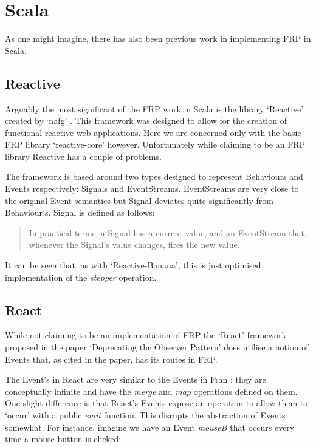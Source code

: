   \section{Scala}
    As one might imagine, there has also been previous work in implementing FRP in Scala. 

    \subsection{Reactive}
      Arguably the most significant of the FRP work in Scala is the library `Reactive' created by `nafg' \cite{Nafg}. This    
      framework was designed to allow for the creation of functional reactive web applications. Here we are concerned 
      only with the basic FRP library `reactive-core' however. Unfortunately while claiming to be an FRP library Reactive
      has a couple of problems.

      The framework is based around two types designed to represent Behaviours and Events respectively: Signals
      and EventStreams. EventStreams are very close to the original Event semantics but Signal deviates quite significantly 
      from Behaviour's. Signal is defined as follows:

      \begin{quote}
        In practical terms, a Signal has a current value, and an EventStream that, whenever the Signal's value changes,     
        fires the new value.
      \end{quote}  
      
      It can be seen that, as with `Reactive-Banana', this is just optimised implementation of the \emph{stepper}
      operation.

    \subsection{React}
      While not claiming to be an implementation of FRP the `React' framework proposed in the 
      paper `Deprecating the Observer Pattern' \cite{Maier2010} does utilise a notion of Events that, as cited in the paper,
      has its routes in FRP.

      The Event's in React are very similar to the Events in Fran \cite{Elliott1997}: they are conceptually infinite
      and have the \emph{merge} and \emph{map} operations defined on them. One slight difference is that React's
      Events expose an operation to allow them to `occur' with a public \emph{emit} function. This disrupts
      the abstraction of Events somewhat. For instance, imagine we have an Event \emph{mouseB} that occurs
      every time a mouse button is clicked:

